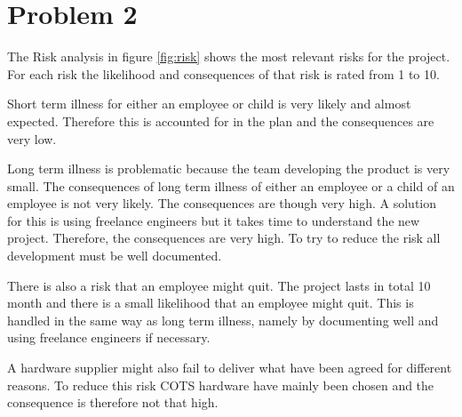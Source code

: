 \chapter{Problem 2}

The Risk analysis in figure \ref{fig:risk} shows the most relevant risks for the project. For each risk the likelihood and consequences of that risk is rated from 1 to 10.

Short term illness for either an employee or child is very likely and almost expected. Therefore this is accounted for in the plan and the consequences are very low.

Long term illness is problematic because the team developing the product is very small. The consequences of long term illness of either an employee or a child of an employee is not very likely. The consequences are though very high. A solution for this is using freelance engineers but it takes time to understand the new project. Therefore, the consequences are very high. To try to reduce the risk all development must be well documented.

There is also a risk that an employee might quit. The project lasts in total 10 month and there is a small likelihood that an employee might quit. This is handled in the same way as long term illness, namely by documenting well and using freelance engineers if necessary.

A hardware supplier might also fail to deliver what have been agreed for different reasons. To reduce this risk COTS hardware have mainly been chosen and the consequence is therefore not that high.

